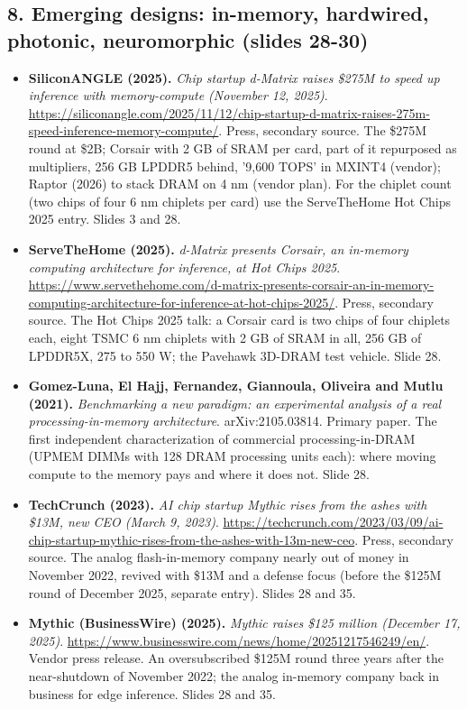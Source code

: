 \documentclass[11pt,letterpaper]{article}
\begin{document}
\subsection*{8. Emerging designs: in-memory, hardwired, photonic, neuromorphic (slides 28-30)}
\begin{itemize}[leftmargin=1.2em,itemsep=3pt]\sloppy
\item \textbf{SiliconANGLE (2025).} \textit{Chip startup d-Matrix raises \$275M to speed up inference with memory-compute (November 12, 2025)}. \url{https://siliconangle.com/2025/11/12/chip-startup-d-matrix-raises-275m-speed-inference-memory-compute/}. Press, secondary source. The \$275M round at \$2B; Corsair with 2 GB of SRAM per card, part of it repurposed as multipliers, 256 GB LPDDR5 behind, '9,600 TOPS' in MXINT4 (vendor); Raptor (2026) to stack DRAM on 4 nm (vendor plan). For the chiplet count (two chips of four 6 nm chiplets per card) use the ServeTheHome Hot Chips 2025 entry. Slides 3 and 28.
\item \textbf{ServeTheHome (2025).} \textit{d-Matrix presents Corsair, an in-memory computing architecture for inference, at Hot Chips 2025}. \url{https://www.servethehome.com/d-matrix-presents-corsair-an-in-memory-computing-architecture-for-inference-at-hot-chips-2025/}. Press, secondary source. The Hot Chips 2025 talk: a Corsair card is two chips of four chiplets each, eight TSMC 6 nm chiplets with 2 GB of SRAM in all, 256 GB of LPDDR5X, 275 to 550 W; the Pavehawk 3D-DRAM test vehicle. Slide 28.
\item \textbf{Gomez-Luna, El Hajj, Fernandez, Giannoula, Oliveira and Mutlu (2021).} \textit{Benchmarking a new paradigm: an experimental analysis of a real processing-in-memory architecture}. arXiv:2105.03814. Primary paper. The first independent characterization of commercial processing-in-DRAM (UPMEM DIMMs with 128 DRAM processing units each): where moving compute to the memory pays and where it does not. Slide 28.
\item \textbf{TechCrunch (2023).} \textit{AI chip startup Mythic rises from the ashes with \$13M, new CEO (March 9, 2023)}. \url{https://techcrunch.com/2023/03/09/ai-chip-startup-mythic-rises-from-the-ashes-with-13m-new-ceo}. Press, secondary source. The analog flash-in-memory company nearly out of money in November 2022, revived with \$13M and a defense focus (before the \$125M round of December 2025, separate entry). Slides 28 and 35.
\item \textbf{Mythic (BusinessWire) (2025).} \textit{Mythic raises \$125 million (December 17, 2025)}. \url{https://www.businesswire.com/news/home/20251217546249/en/}. Vendor press release. An oversubscribed \$125M round three years after the near-shutdown of November 2022; the analog in-memory company back in business for edge inference. Slides 28 and 35.

\end{itemize}
\end{document}
